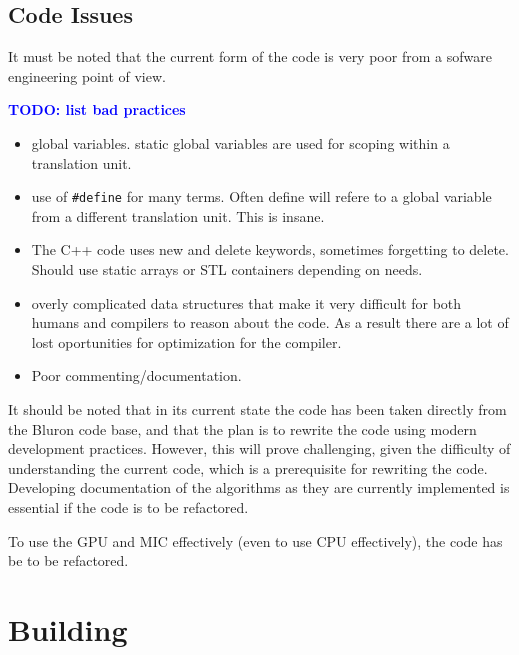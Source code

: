 \documentclass[11pt,a4paper]{article}
\newcommand{\todo}[1]{\textbf{\textcolor{blue}{TODO: #1}}} %
\newcommand{\lst}[1]{\lstinline!#1!} %
\begin{document}
\subsection{Code Issues}
It must be noted that the current form of the code is very poor from a sofware engineering point of view.

\todo{list bad practices}
\begin{itemize}
    \item
        global variables. static global variables are used for scoping within a translation unit.
    \item
        use of \lst{#define} for many terms. Often define will refere to a global variable from a different translation unit. This is insane.
    \item
        The C++ code uses new and delete keywords, sometimes forgetting to delete. Should use static arrays or STL containers depending on needs.
    \item
        overly complicated data structures that make it very difficult for both humans and compilers to reason about the code. As a result there are a lot of lost oportunities for optimization for the compiler.
    \item
        Poor commenting/documentation.
\end{itemize}

It should be noted that in its current state the code has been taken directly from the Bluron code base, and that the plan is to rewrite the code using modern development practices. However, this will prove challenging, given the difficulty of understanding the current code, which is a prerequisite for rewriting the code. Developing documentation of the algorithms as they are currently implemented is essential if the code is to be refactored.

To use the GPU and MIC effectively (even to use CPU effectively), the code has be to be refactored.
\section{Building}
\end{document}
